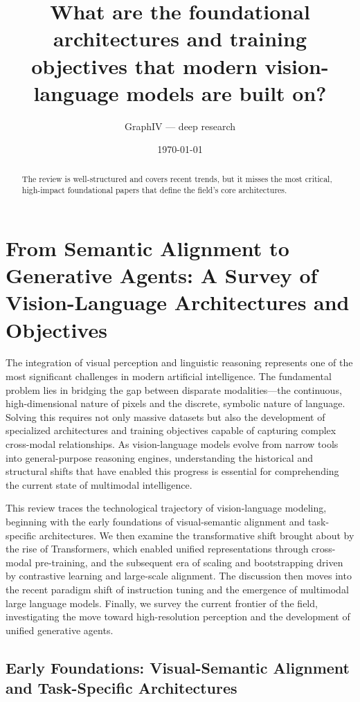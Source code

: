 \documentclass[11pt]{article}
\title{What are the foundational architectures and training objectives that modern vision-language models are built on?}
\author{GraphIV --- deep research}
\date{\today}
\begin{document}
\maketitle

\begin{abstract}
The review is well-structured and covers recent trends, but it misses the most critical, high-impact foundational papers that define the field's core architectures.
\end{abstract}

\section{From Semantic Alignment to Generative Agents: A Survey of Vision-Language Architectures and Objectives}

The integration of visual perception and linguistic reasoning represents one of the most significant challenges in modern artificial intelligence. The fundamental problem lies in bridging the gap between disparate modalities—the continuous, high-dimensional nature of pixels and the discrete, symbolic nature of language. Solving this requires not only massive datasets but also the development of specialized architectures and training objectives capable of capturing complex cross-modal relationships. As vision-language models evolve from narrow tools into general-purpose reasoning engines, understanding the historical and structural shifts that have enabled this progress is essential for comprehending the current state of multimodal intelligence.

This review traces the technological trajectory of vision-language modeling, beginning with the early foundations of visual-semantic alignment and task-specific architectures. We then examine the transformative shift brought about by the rise of Transformers, which enabled unified representations through cross-modal pre-training, and the subsequent era of scaling and bootstrapping driven by contrastive learning and large-scale alignment. The discussion then moves into the recent paradigm shift of instruction tuning and the emergence of multimodal large language models. Finally, we survey the current frontier of the field, investigating the move toward high-resolution perception and the development of unified generative agents.

\subsection{Early Foundations: Visual-Semantic Alignment and Task-Specific Architectures}
\end{document}
